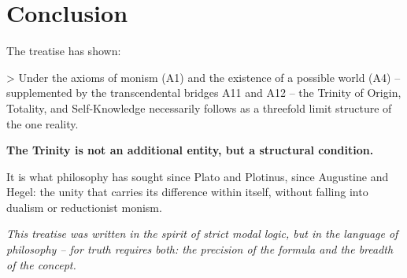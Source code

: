\documentclass[
]{article}
\begin{document}
\section{Conclusion}\label{conclusion}

The treatise has shown:

> Under the axioms of monism (A1) and the existence of a possible world (A4) – supplemented by the transcendental bridges A11 and A12 – the Trinity of Origin, Totality, and Self-Knowledge necessarily follows as a threefold limit structure of the one reality.

\textbf{The Trinity is not an additional entity, but a structural condition.}

It is what philosophy has sought since Plato and Plotinus, since Augustine and Hegel: the unity that carries its difference within itself, without falling into dualism or reductionist monism.

\begin{center}
\emph{This treatise was written in the spirit of strict modal logic, but in the language of philosophy – for truth requires both: the precision of the formula and the breadth of the concept.}
\end{center}
\end{document}
